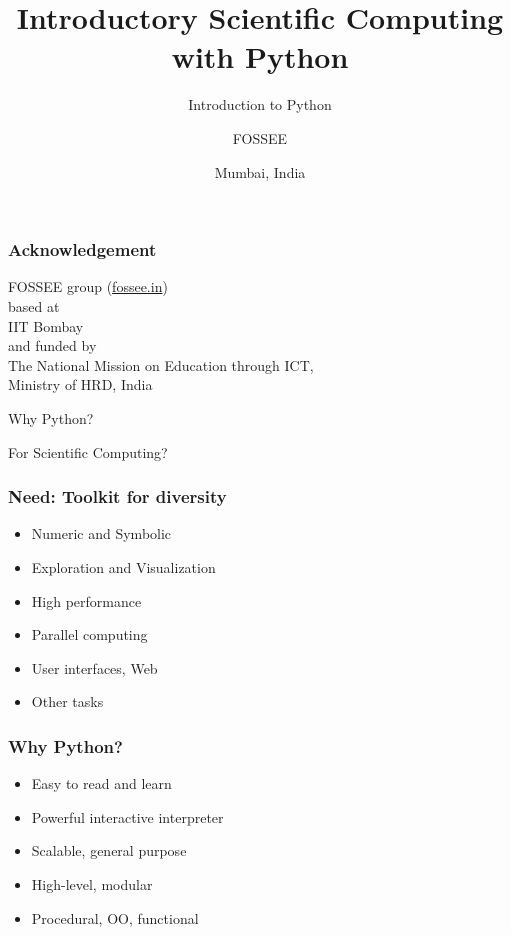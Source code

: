 \documentclass[14pt,compress]{beamer}
\title[Introduction]{Introductory Scientific Computing with
Python}
\subtitle{Introduction to Python}
\author[FOSSEE] {FOSSEE}
\institute[IIT Bombay] {Department of Aerospace Engineering\\IIT Bombay}
\date[] {Mumbai, India
}
\begin{document}
\begin{frame}
  \maketitle
\end{frame}

\begin{frame}
  \frametitle{Acknowledgement}
  \Large
  \begin{center}
    \alert{FOSSEE group (\url{fossee.in})} \\
    based at\\
    \alert{IIT Bombay}\\
    and funded by\\
    The National Mission on Education through ICT, \\
    \alert{Ministry of HRD, India}
  \end{center}
\end{frame}


\begin{frame}[plain]
    \begin{center}
        \Huge
        Why Python?
        \vspace*{1in}

        For Scientific Computing?
    \end{center}

\end{frame}

\begin{frame}
  \frametitle{Need: Toolkit for diversity}
  \Large
     \begin{itemize}
        \item Numeric and Symbolic
        \item Exploration and Visualization
        \item High performance
        \item Parallel computing
        \item User interfaces, Web
        \item Other tasks
  \end{itemize}
\end{frame}

\begin{frame}[plain]
  \frametitle{Why Python?}
  \Large
  \begin{itemize}
  \item Easy to read and learn
  \item Powerful interactive interpreter
  \item Scalable, general purpose
  \item High-level, modular
  \item Procedural, OO, functional
  \end{itemize}
\end{frame}
\end{document}
